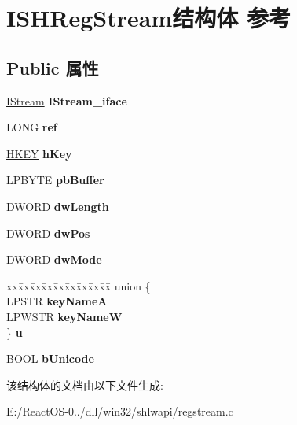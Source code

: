 \hypertarget{struct_i_s_h_reg_stream}{}\section{I\+S\+H\+Reg\+Stream结构体 参考}
\label{struct_i_s_h_reg_stream}
\subsection*{Public 属性}
\begin{DoxyCompactItemize}
\item 
\mbox{\label{struct_i_s_h_reg_stream_aceff2eb6c2174b5c5b448775c361d529}} 
\hyperlink{interface_i_stream}{I\+Stream} {\bfseries I\+Stream\+\_\+iface}
\item 
\mbox{\label{struct_i_s_h_reg_stream_af7241356370e689793e2a30b0834ae41}} 
L\+O\+NG {\bfseries ref}
\item 
\mbox{\label{struct_i_s_h_reg_stream_aabc418064b773c14290fd5ea449c8acc}} 
\hyperlink{interfacevoid}{H\+K\+EY} {\bfseries h\+Key}
\item 
\mbox{\label{struct_i_s_h_reg_stream_a24d7ffd6610aee46f5acf559c4dffd8c}} 
L\+P\+B\+Y\+TE {\bfseries pb\+Buffer}
\item 
\mbox{\label{struct_i_s_h_reg_stream_a7d602f4d93e29ec0e5e98b17e77103b6}} 
D\+W\+O\+RD {\bfseries dw\+Length}
\item 
\mbox{\label{struct_i_s_h_reg_stream_ab025ed7e940b13b7862c45dca61683ec}} 
D\+W\+O\+RD {\bfseries dw\+Pos}
\item 
\mbox{\label{struct_i_s_h_reg_stream_a9615a4877216cb024efda3cc4f9359d2}} 
D\+W\+O\+RD {\bfseries dw\+Mode}
\item 
\mbox{\label{struct_i_s_h_reg_stream_a10568aae22d134494f3475e3c80ec32f}} 
\begin{tabbing}
xx\=xx\=xx\=xx\=xx\=xx\=xx\=xx\=xx\=\kill
union \{\\
\>LPSTR {\bfseries keyNameA}\\
\>LPWSTR {\bfseries keyNameW}\\
\} {\bfseries u}\\

\end{tabbing}\item 
\mbox{\label{struct_i_s_h_reg_stream_a3538c9f0a343054601a3c705b5393af9}} 
B\+O\+OL {\bfseries b\+Unicode}
\end{DoxyCompactItemize}


该结构体的文档由以下文件生成\+:\begin{DoxyCompactItemize}
\item 
E\+:/\+React\+O\+S-\/0../dll/win32/shlwapi/regstream.\+c\end{DoxyCompactItemize}
